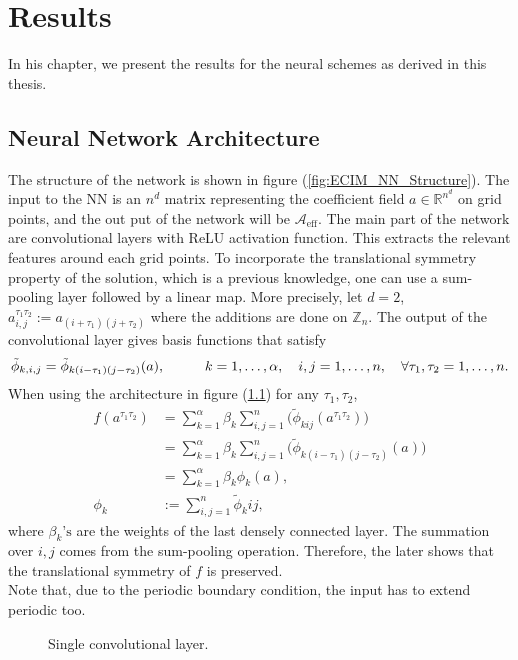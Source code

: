 \chapter{Results}
In his chapter, we present the results for the neural schemes as derived in this thesis.
\section{Neural Network Architecture}
The structure of the network is shown in figure (\ref{fig:ECIM_NN_Structure}). The input to the NN is an $n^d$ matrix representing the coefficient field $a\in \mathbb{R}^{n^d}$ on grid points, and the out put of the network will be $\mathscr{A}_\text{eff}$. The main part of the network are convolutional layers with ReLU activation function. This extracts the relevant features around each grid points. To incorporate the translational symmetry property of the solution, which is a  previous knowledge, one can use a sum-pooling layer followed by a linear map. More precisely, let $d=2$, $a_{i,j}^{\tau_{1}\tau_{2}}:=a_{(i+\tau_{1})(j+\tau_{2})}$ where the additions are done on $\mathbb{Z}_n$. The output of the convolutional layer gives basis functions that satisfy
\begin{equation*}
\tilde{\phi}_{k,i,j} = \tilde{\phi}_{k(i-\tau_{1})(j-\tau_{2})}(a), \hspace*{1cm} k=1,\dots, \alpha, \quad i,j = 1, \dots, n, \quad \forall \tau_{1}, \tau_{2} = 1, \dots,n.
\end{equation*}
When using the architecture in figure (\ref{fig:NLSE_NN_Structure}) for any $\tau_{1}, \tau_{2}$,
\begin{align*}
f(a^{\tau_{1}\tau_{2}}) &= \sum_{k=1}^{\alpha} \beta_k \sum_{i,j=1}^{n} \biggl( \tilde{\phi}_{kij}(a^{\tau_{1}\tau_{2}}) \biggr)\\ &= \sum_{k=1}^{\alpha} \beta_k \sum_{i,j=1}^{n} \biggl( \tilde{\phi}_{k(i-\tau_{1})(j-\tau_{2})}(a) \biggr)\\ &= \sum_{k=1}^{\alpha} \beta_k \phi_k (a), \\
\phi_k &:= \sum_{i,j=1}^{n} \tilde{\phi}_kij,
\end{align*}
where $\beta_k\text{'s}$ are the weights of the last densely connected layer. The summation over $i, j$ comes from the sum-pooling operation. Therefore, the later shows that the translational symmetry of $f$ is preserved.\\
Note that, due to the periodic boundary condition, the input has to extend periodic too. \\
\begin{figure}[h!]
	{
		\centering
		\def\svgwidth{\columnwidth}
		\scalebox{0.75}{}
		\caption{Single convolutional layer.}
		\label{fig:NLSE_NN_Structure}
	}
\end{figure}

